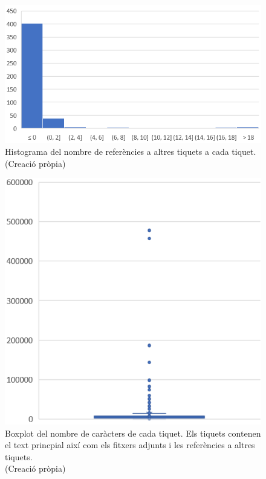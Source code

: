 \begin{figure}[H]
    \centering
    \includegraphics[width=\textwidth]{histograma_num_refs.png}
    \caption[Histograma del nombre de referències a cada tiquet]{Histograma del nombre de referències a altres tiquets a cada tiquet. \\ (Creació pròpia)}
    \label{fig:histograma_num_refs}
\end{figure}


\begin{figure}[H]
    \centering
    \includegraphics[width=\textwidth]{boxplot_num_chars_adj_refs.png}
    \caption[Boxplot dels caràcters de cada tiquet amb adjunts i referències]{Boxplot del nombre de caràcters de cada tiquet. Els tiquets contenen el text princpial així com els fitxers adjunts i les referències a altres tiquets. \\ (Creació pròpia)}
    \label{fig:boxplot_num_chars_adj_refs}
\end{figure}


